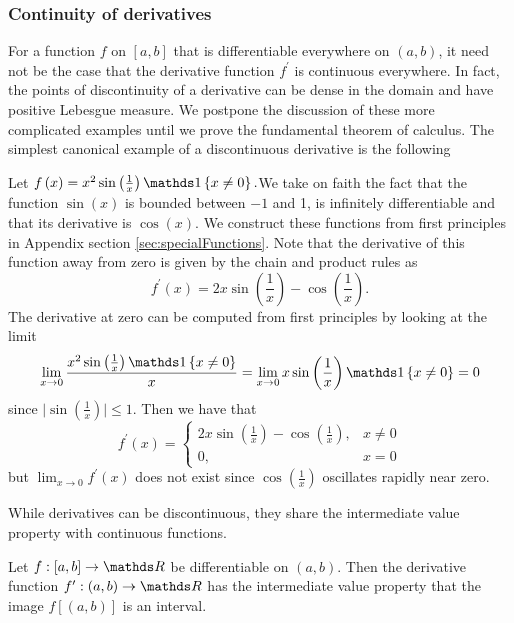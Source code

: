 \subsubsection{Continuity of derivatives}

For a function $f$ on $\left[a,b\right]$ that is differentiable
everywhere on $\left(a,b\right)$, it need not be the case that the
derivative function $f^{\prime}$ is continuous everywhere. In fact,
the points of discontinuity of a derivative can be dense in the domain
and have positive Lebesgue measure. We postpone the discussion of
these more complicated examples until we prove the fundamental theorem
of calculus. The simplest canonical example of a discontinuous derivative
is the following
\begin{example}
\label{exa:discontinuousDerivative}Let $f\left(x\right)=x^{2}\sin\left(\frac{1}{x}\right)\indicate\left\{ x\neq0\right\} .$We
take on faith the fact that the function $\sin\left(x\right)$ is
bounded between $-1$ and 1, is infinitely differentiable and that
its derivative is $\cos\left(x\right)$. We construct these functions
from first principles in Appendix section \ref{sec:specialFunctions}.
Note that the derivative of this function away from zero is given
by the chain and product rules as 
\[
f^{\prime}\left(x\right)=2x\sin\left(\frac{1}{x}\right)-\cos\left(\frac{1}{x}\right).
\]
The derivative at zero can be computed from first principles by looking
at the limit
\[
\lim_{x\to0}\frac{x^{2}\sin\left(\frac{1}{x}\right)\indicate\left\{ x\neq0\right\} }{x}=\lim_{x\to0}x\sin\left(\frac{1}{x}\right)\indicate\left\{ x\neq0\right\} =0
\]
since $\lvert\sin\left(\frac{1}{x}\right)\rvert\leq1$. Then we have
that 
\[
f^{\prime}\left(x\right)=\begin{cases}
2x\sin\left(\frac{1}{x}\right)-\cos\left(\frac{1}{x}\right), & x\neq0\\
0, & x=0
\end{cases}
\]
but $\lim_{x\to0}f^{\prime}\left(x\right)$ does not exist since $\cos\left(\frac{1}{x}\right)$
oscillates rapidly near zero.
\end{example}

While derivatives can be discontinuous, they share the intermediate
value property with continuous functions.
\begin{prop}
\label{prop:darbouxTheorem}Let $f:\left[a,b\right]\to\R$ be differentiable
on $\left(a,b\right).$ Then the derivative function $f^{\prime}:\left(a,b\right)\to\R$
has the intermediate value property that the image $f\left[\left(a,b\right)\right]$
is an interval.
\end{prop}

